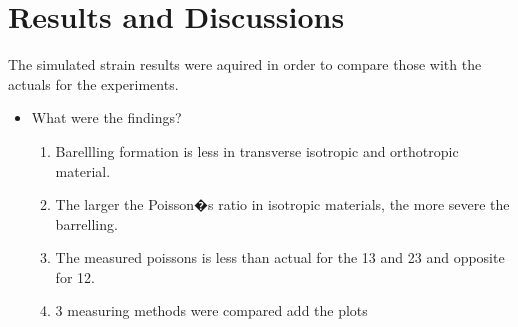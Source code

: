 \documentclass[review]{elsarticle}
\begin{document}
\section{Results and Discussions}
The simulated strain results were aquired in order to compare those with the
actuals for the experiments. 







\begin{itemize}
\color{red}
\item What were the findings?

	\begin{enumerate}
	\color{black}
		\item Barellling formation is less in transverse isotropic and orthotropic
		material.
		\item The larger the Poisson�s ratio in isotropic materials, the more severe
		the barrelling.
		\item The measured poissons is less than actual for the 13 and 23 and opposite
		for 12.
		\item 3 measuring methods were compared {\color{red} add the plots}
	\end{enumerate}
\end{itemize}


\color{black}
\end{document}
